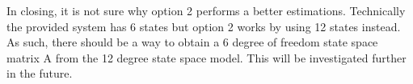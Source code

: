 \documentclass[paper=a4, fontsize=12pt]{scrartcl} %
\begin{document}
%
In closing, it is not sure why option 2 performs a better estimations. Technically the provided system has 6 states but option 2 works by using 12 states instead. As such, there should be a way to obtain a 6 degree of freedom state space matrix A from the 12 degree state space model. This will be investigated further in the future.
\end{document}
